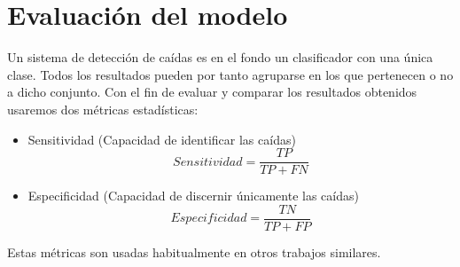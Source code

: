 \documentclass[../tfm.tex]{subfiles}
\begin{document}

\section{Evaluación del modelo}

Un sistema de detección de caídas es en el fondo un clasificador con una única clase. Todos los resultados pueden por tanto agruparse en los que pertenecen o no a dicho conjunto. Con el fin de evaluar y comparar los resultados obtenidos usaremos dos métricas estadísticas:
\begin{itemize}
  \item Sensitividad (Capacidad de identificar las caídas)
  \[
    Sensitividad = \frac{TP}{TP+FN}
  \]
  \item Especificidad (Capacidad de discernir únicamente las caídas)
  \[
    Especificidad = \frac{TN}{TP+FP}
  \]
\end{itemize}

Estas métricas son usadas habitualmente en otros trabajos similares\cite{Noury2007,Chen2005, Bourke2006}.  
\end{document}
